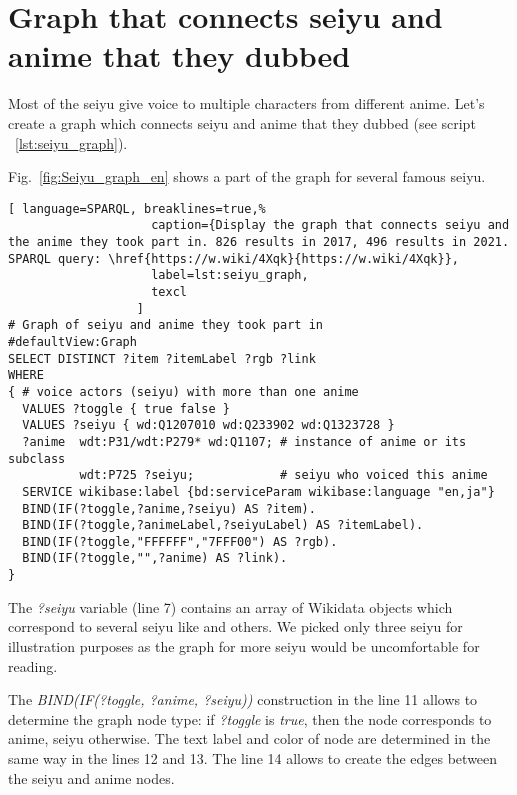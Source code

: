 \section{Graph that connects seiyu and anime that they dubbed}

Most of the seiyu give voice to multiple characters from different anime. Let's create a graph which connects seiyu and anime that they dubbed (see script ~\ref{lst:seiyu_graph}).

Fig.~\ref{fig:Seiyu_graph_en} shows a part of the graph for several famous seiyu.

\begin{widepar}%
\captionsetup[lstlisting]{format=llapwide18}%
%
\begin{lstlisting}[ language=SPARQL, breaklines=true,%
                    caption={Display the graph that connects seiyu and the anime they took part in. 826 results in 2017, 496 results in 2021. SPARQL query: \href{https://w.wiki/4Xqk}{https://w.wiki/4Xqk}},
                    label=lst:seiyu_graph,
                    texcl
                  ]
# Graph of seiyu and anime they took part in
#defaultView:Graph
SELECT DISTINCT ?item ?itemLabel ?rgb ?link
WHERE
{ # voice actors (seiyu) with more than one anime
  VALUES ?toggle { true false }
  VALUES ?seiyu { wd:Q1207010 wd:Q233902 wd:Q1323728 }
  ?anime  wdt:P31/wdt:P279* wd:Q1107; # instance of anime or its subclass
          wdt:P725 ?seiyu;            # seiyu who voiced this anime 
  SERVICE wikibase:label {bd:serviceParam wikibase:language "en,ja"}
  BIND(IF(?toggle,?anime,?seiyu) AS ?item).
  BIND(IF(?toggle,?animeLabel,?seiyuLabel) AS ?itemLabel).
  BIND(IF(?toggle,"FFFFFF","7FFF00") AS ?rgb).
  BIND(IF(?toggle,"",?anime) AS ?link).
}
\end{lstlisting}%
\end{widepar}%

The \emph{?seiyu} variable (line 7) contains an array of Wikidata objects which correspond to several seiyu like  and others. We picked only three seiyu for illustration purposes as the graph for more seiyu would be uncomfortable for reading.

The \emph{BIND(IF(?toggle, ?anime, ?seiyu))} construction in the line \num{11} allows to determine the graph node type: if \emph{?toggle} is \emph{true}, then the node corresponds to anime, seiyu otherwise. The text label and color of node are determined in the same way in the lines \num{12} and \num{13}. The line \num{14} allows to create the edges between the seiyu and anime nodes.

\begin{figure*}

    \setlength{\fboxsep}{0pt}%
    \setlength{\fboxrule}{1pt}%
	\caption[Part of graph that connects seiyu and the anime they took part in, 2021.]{Part of graph that connects seiyu and the anime they took part in, 2021. The graph is constructed using the output of script~\ref{lst:seiyu_graph}.}%
    \label{fig:Seiyu_graph_en}%
\end{figure*} 
